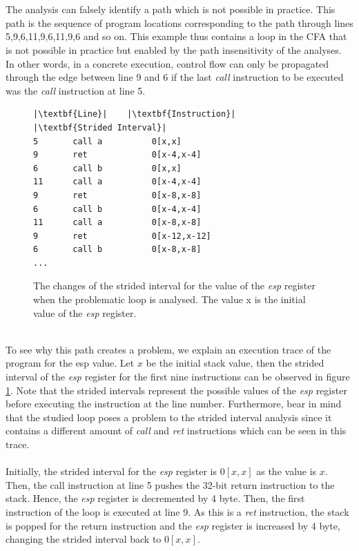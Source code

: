 \documentclass{kththesis}
\renewcommand{\it}[1]{\textit{#1}}
\begin{document}
\\ \\
The analysis can falsely identify a path which is not possible in practice. This path is the sequence of program locations corresponding to the path through lines 5,9,6,11,9,6,11,9,6 and so on. This example thus contains a loop in the CFA that is not possible in practice but enabled by the path insensitivity of the analyses. In other words, in a concrete execution, control flow can only be propagated through the edge between line 9 and 6 if the last \it{call} instruction to be executed was the \it{call} instruction at line 5.
\begin{figure}[!t]
    \centering
\begin{tcolorbox}
\begin{verbatim}
|\textbf{Line}|    |\textbf{Instruction}|     |\textbf{Strided Interval}|
5       call a          0[x,x]
9       ret             0[x-4,x-4]
6       call b          0[x,x]
11      call a          0[x-4,x-4]
9       ret             0[x-8,x-8]
6       call b          0[x-4,x-4]
11      call a          0[x-8,x-8]
9       ret             0[x-12,x-12]
6       call b          0[x-8,x-8]
...
\end{verbatim}
\end{tcolorbox}
\caption[The changes of the strided interval for the value of the \it{esp} register when the problematic loop is analysed.]{The changes of the strided interval for the value of the \it{esp} register when the problematic loop is analysed. The value x is the initial value of the \it{esp} register.}
    \label{fig:badLoopTrace}
\end{figure}
\noindent
\\
To see why this path creates a problem, we explain an execution trace of the program for the esp value. Let $x$ be the initial stack value, then the strided interval of the \it{esp} register for the first nine instructions can be observed in figure \ref{fig:badLoopTrace}. Note that the strided intervals represent the possible values of the \it{esp} register before executing the instruction at the line number. Furthermore, bear in mind that the studied loop poses a problem to the strided interval analysis since it contains a different amount of \it{call} and \it{ret} instructions which can be seen in this trace.
\\ \\
Initially, the strided interval for the \it{esp} register is $0[x,x]$ as the value is $x$. Then, the call instruction at line 5 pushes the 32-bit return instruction to the stack. Hence, the \it{esp} register is decremented by 4 byte. Then, the first instruction of the loop is executed at line 9. As this is a \it{ret} instruction, the stack is popped for the return instruction and the \it{esp} register is increased by 4 byte, changing the strided interval back to $0[x,x]$. 
\end{document}
